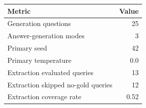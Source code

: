 \begin{tabular}{lr}
\toprule
Metric & Value \\
\midrule
Generation questions & 25 \\
Answer-generation modes & 3 \\
Primary seed & 42 \\
Primary temperature & 0.0 \\
Extraction evaluated queries & 13 \\
Extraction skipped no-gold queries & 12 \\
Extraction coverage rate & 0.52 \\
\bottomrule
\end{tabular}

